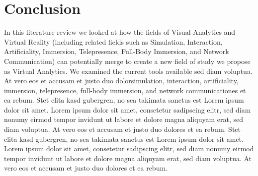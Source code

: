 \section{Conclusion}

In this literature review we looked at how the fields of Visual Analytics
and Virtual Reality (including related fields such as Simulation, Interaction, Artificiality, Immersion, Telepresence, Full-Body Immersion, and Network Communication) can potentially merge to create a new field of study we propose as Virtual Analytics. We examined the current tools available
sed diam voluptua. At vero eos et accusam et justo duo dolorsimulation, interaction, artificiality, immersion, telepresence, full-body immersion, and network communicationes et ea
rebum. Stet clita kasd gubergren, no sea takimata sanctus est Lorem
ipsum dolor sit amet. Lorem ipsum dolor sit amet, consetetur
sadipscing elitr, sed diam nonumy eirmod tempor invidunt ut labore et
dolore magna aliquyam erat, sed diam voluptua. At vero eos et accusam
et justo duo dolores et ea rebum. Stet clita kasd gubergren, no sea
takimata sanctus est Lorem ipsum dolor sit amet. Lorem ipsum dolor sit
amet, consetetur sadipscing elitr, sed diam nonumy eirmod tempor
invidunt ut labore et dolore magna aliquyam erat, sed diam
voluptua. At vero eos et accusam et justo duo dolores et ea
rebum.